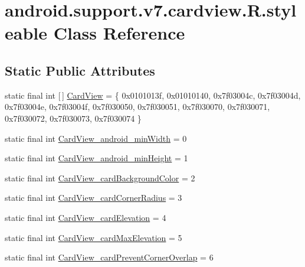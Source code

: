 \hypertarget{classandroid_1_1support_1_1v7_1_1cardview_1_1R_1_1styleable}{}\section{android.\+support.\+v7.\+cardview.\+R.\+styleable Class Reference}
\label{classandroid_1_1support_1_1v7_1_1cardview_1_1R_1_1styleable}
\subsection*{Static Public Attributes}
\begin{DoxyCompactItemize}
\item 
static final int \mbox{[}$\,$\mbox{]} \mbox{\hyperlink{classandroid_1_1support_1_1v7_1_1cardview_1_1R_1_1styleable_ad08b98a07471f174f404c58941fc82ca}{Card\+View}} = \{ 0x0101013f, 0x01010140, 0x7f03004c, 0x7f03004d, 0x7f03004e, 0x7f03004f, 0x7f030050, 0x7f030051, 0x7f030070, 0x7f030071, 0x7f030072, 0x7f030073, 0x7f030074 \}
\item 
static final int \mbox{\hyperlink{classandroid_1_1support_1_1v7_1_1cardview_1_1R_1_1styleable_a2dea7039c297b13bee791d7951afbecb}{Card\+View\+\_\+android\+\_\+min\+Width}} = 0
\item 
static final int \mbox{\hyperlink{classandroid_1_1support_1_1v7_1_1cardview_1_1R_1_1styleable_a94614e1d0361bf7c38fa204911febfcd}{Card\+View\+\_\+android\+\_\+min\+Height}} = 1
\item 
static final int \mbox{\hyperlink{classandroid_1_1support_1_1v7_1_1cardview_1_1R_1_1styleable_a19f2c115641c792adf4bfc71df660f54}{Card\+View\+\_\+card\+Background\+Color}} = 2
\item 
static final int \mbox{\hyperlink{classandroid_1_1support_1_1v7_1_1cardview_1_1R_1_1styleable_aca4b00ea9004e1dcadb5ed31cac74b52}{Card\+View\+\_\+card\+Corner\+Radius}} = 3
\item 
static final int \mbox{\hyperlink{classandroid_1_1support_1_1v7_1_1cardview_1_1R_1_1styleable_a3d04a4a20e413c559cea671a16ecd4ec}{Card\+View\+\_\+card\+Elevation}} = 4
\item 
static final int \mbox{\hyperlink{classandroid_1_1support_1_1v7_1_1cardview_1_1R_1_1styleable_aaec71b4ee81e94d6c93572459bf28939}{Card\+View\+\_\+card\+Max\+Elevation}} = 5
\item 
static final int \mbox{\hyperlink{classandroid_1_1support_1_1v7_1_1cardview_1_1R_1_1styleable_adb2d991c2a7fb631c70a887189c1f2c4}{Card\+View\+\_\+card\+Prevent\+Corner\+Overlap}} = 6

\end{DoxyCompactItemize}
